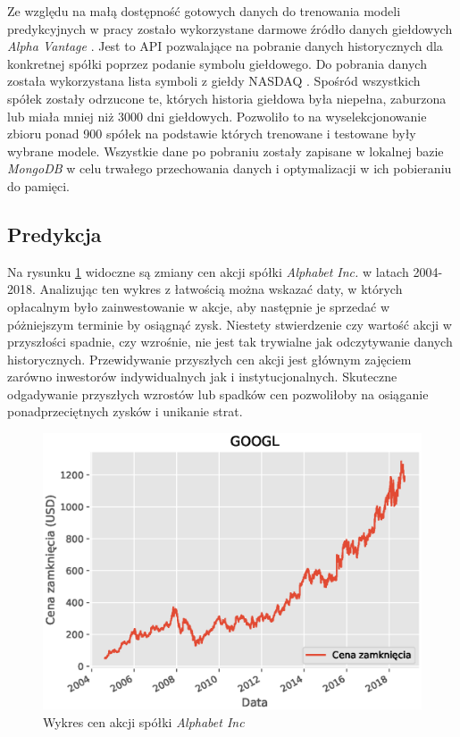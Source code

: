 \documentclass[a4paper, twoside, 11pt, openright]{article}
\begin{document}
Ze względu na małą dostępność gotowych danych do trenowania modeli predykcyjnych w pracy zostało wykorzystane darmowe źródło danych giełdowych \textit{Alpha Vantage} \cite{alphavantage}. Jest to API pozwalające na pobranie danych historycznych dla konkretnej spółki poprzez podanie symbolu giełdowego. Do pobrania danych została wykorzystana lista symboli z giełdy NASDAQ \cite{nasdaq}. Spośród wszystkich spółek zostały odrzucone te, których historia giełdowa była niepełna, zaburzona lub miała mniej niż 3000 dni giełdowych. Pozwoliło to na wyselekcjonowanie zbioru ponad 900 spółek na podstawie których trenowane i testowane były wybrane modele. Wszystkie dane po pobraniu zostały zapisane w lokalnej bazie \textit{MongoDB} \cite{mongodb} w celu trwałego przechowania danych i optymalizacji w ich pobieraniu do pamięci.

\subsection{Predykcja}

Na rysunku \ref{alphabet_history} widoczne są zmiany cen akcji spółki \textit{Alphabet Inc.} w latach 2004-2018. Analizując ten wykres z łatwością można wskazać daty, w których opłacalnym było zainwestowanie w akcje, aby następnie je sprzedać w póżniejszym terminie by osiągnąć zysk. Niestety stwierdzenie czy wartość akcji w przyszłości spadnie, czy wzrośnie, nie jest tak trywialne jak odczytywanie danych historycznych. Przewidywanie przyszłych cen akcji jest głównym zajęciem zarówno inwestorów indywidualnych jak i instytucjonalnych. Skuteczne odgadywanie przyszłych wzrostów lub spadków cen pozwoliłoby na osiąganie ponadprzeciętnych zysków i unikanie strat.


\begin{figure}[H]
\centering \includegraphics[scale=0.9]{img/linear_regression/l_r_stock_data}
\caption{Wykres cen akcji spółki \textit{Alphabet Inc}}
\label{alphabet_history}
\end{figure}
\end{document}
